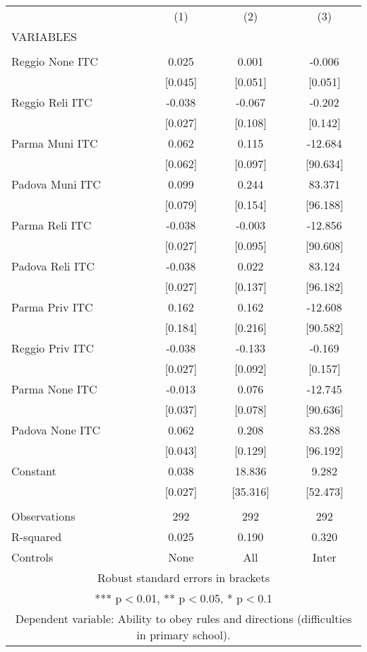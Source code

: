\begin{tabular}{lccc} \hline
 & (1) & (2) & (3) \\
VARIABLES &  &  &  \\ \hline
 &  &  &  \\
Reggio None ITC & 0.025 & 0.001 & -0.006 \\
 & [0.045] & [0.051] & [0.051] \\
Reggio Reli ITC & -0.038 & -0.067 & -0.202 \\
 & [0.027] & [0.108] & [0.142] \\
Parma Muni ITC & 0.062 & 0.115 & -12.684 \\
 & [0.062] & [0.097] & [90.634] \\
Padova Muni ITC & 0.099 & 0.244 & 83.371 \\
 & [0.079] & [0.154] & [96.188] \\
Parma Reli ITC & -0.038 & -0.003 & -12.856 \\
 & [0.027] & [0.095] & [90.608] \\
Padova Reli ITC & -0.038 & 0.022 & 83.124 \\
 & [0.027] & [0.137] & [96.182] \\
Parma Priv ITC & 0.162 & 0.162 & -12.608 \\
 & [0.184] & [0.216] & [90.582] \\
Reggio Priv ITC & -0.038 & -0.133 & -0.169 \\
 & [0.027] & [0.092] & [0.157] \\
Parma None ITC & -0.013 & 0.076 & -12.745 \\
 & [0.037] & [0.078] & [90.636] \\
Padova None ITC & 0.062 & 0.208 & 83.288 \\
 & [0.043] & [0.129] & [96.192] \\
Constant & 0.038 & 18.836 & 9.282 \\
 & [0.027] & [35.316] & [52.473] \\
 &  &  &  \\
Observations & 292 & 292 & 292 \\
R-squared & 0.025 & 0.190 & 0.320 \\
 Controls & None & All & Inter \\ \hline
\multicolumn{4}{c}{ Robust standard errors in brackets} \\
\multicolumn{4}{c}{ *** p$<$0.01, ** p$<$0.05, * p$<$0.1} \\
\multicolumn{4}{c}{ Dependent variable: Ability to obey rules and directions (difficulties in primary school).} \\
\end{tabular}
